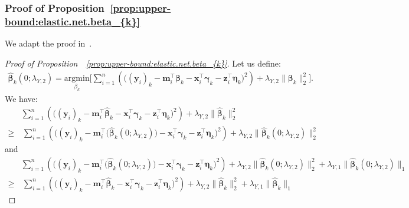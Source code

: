 \documentclass[
  12pt]{article}
\def\M{\mathbf{m}}
\def\X{\mathbf{x}}
\def\Y{\mathbf{y}}
\def\Z{\mathbf{z}}
\begin{document}
\subsubsection{Proof of Proposition~\ref{prop:upper-bound:elastic.net.beta_{k}}}   
%
\label{sec:proof:prop:upper-bound:elastic.net.beta_{k}}
We adapt the proof  in~\cite[Theorem  3.1]{Zou-Zhang:2009}.  
\begin{proof}[Proof of Proposition~~\ref{prop:upper-bound:elastic.net.beta_{k}}]   
	Let us define: 
	\begin{align}
		\widehat{\bm{\beta}}_{k} ( 0 ; \lambda_{Y,2} )  =  \underset{   {\beta_{k} } }{ \textrm{argmin} }  \Bigg[ \sum_{i=1}^{n}  \left(   \big(  (\Y_{i})_{k}   -     \M_{i}^{\top}\bm{\beta}_{k}  -   \X_{i}^{\top} \bm{\gamma}_{k}   -   \Z_{i}^{\top} \bm{\eta}_{k}     
		\big)^{2}   
		\right)   
		+  \lambda_{Y,2}  \big\|  \bm{\beta}_{k}   \big\|_{2}^{2}  \Bigg]  .
	\end{align}
	We have: 
	\begin{align*}  &   \sum_{i=1}^{n}  \left(   \big(  (\Y_{i})_{k}   -    \M_{i}^{\top} \widehat{\bm{\beta}}_{k}  -   \X_{i}^{\top} \bm{\gamma}_{k}   -   \Z_{i}^{\top} \bm{\eta}_{k}     
		\big)^{2}   
		\right)   
		+  \lambda_{Y,2}  \big\|  \widehat{\bm{\beta}}_{k}   \big\|_{2}^{2}   
		\\
		\geq  &   \,   
		\sum_{i=1}^{n}  \left(   \big(  (\Y_{i})_{k}  -  \M_{i}^{\top} \big(  \widehat{\bm{\beta}}_{k} ( 0 ; \lambda_{Y,2}  )   \big)  -   \X_{i}^{\top} \bm{\gamma}_{k}   -   \Z_{i}^{\top} \bm{\eta}_{k}     
		\big)^{2}   
		\right)   
		+  \lambda_{Y,2}  \big\|   \widehat{\bm{\beta}}_{k} ( 0 ; \lambda_{Y,2} )    \big\|_{2}^{2}   
	\end{align*}
	and  
	\begin{align*}
		&   \sum_{i=1}^{n}    \left(  \big(    (\Y_{i})_{k}  -  \M_{i}^{\top} \big(  \widehat{\bm{\beta}}_{k} ( 0 ; \lambda_{Y,2}  )   \big)  -   \X_{i}^{\top} \bm{\gamma}_{k}   -   \Z_{i}^{\top} \bm{\eta}_{k}     
		\big)^{2}   
		\right)   
		+  \lambda_{Y,2}  \big\|   \widehat{\bm{\beta}}_{k} ( 0 ; \lambda_{Y,2} )    \big\|_{2}^{2}   +  \lambda_{Y,1}  \big\|   \widehat{\bm{\beta}}_{k} ( 0 ; \lambda_{Y,2} )    \big\|_{1}
		\\
		\geq   &  \,  
		\sum_{i=1}^{n}  \left(   \big(  (\Y_{i})_{k}   -    \M_{i}^{\top} \widehat{\bm{\beta}}_{k}  -   \X_{i}^{\top} \bm{\gamma}_{k}   -   \Z_{i}^{\top} \bm{\eta}_{k}     
		\big)^{2}   
		\right)   
		+   \lambda_{Y,2}    \big\|   \widehat{\bm{\beta}}_{k}    \big\|_{2}^{2}   +   \lambda_{Y,1}  \big\|  \widehat{\bm{\beta}}_{k}    \big\|_{1}    

\end{align*}
\end{proof}
\end{document}
